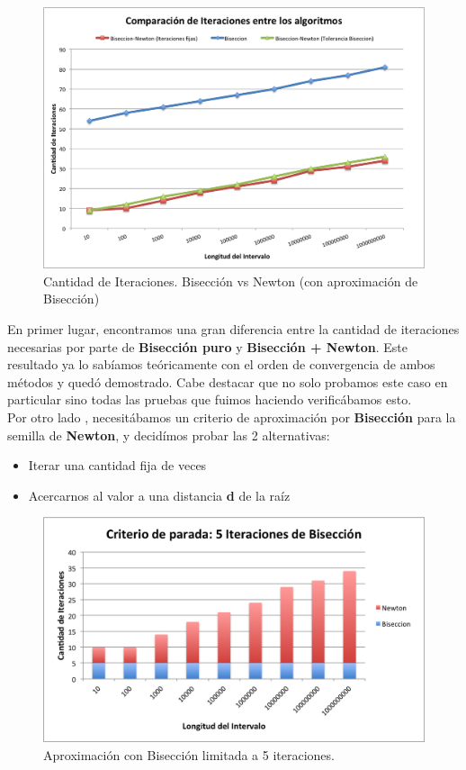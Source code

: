 \documentclass[a4paper]{article}
\begin{document}
\begin{figure}[H]
  \centering
  \includegraphics[scale=0.80]{graficos/1-Biseccion_vs_BiseccionNewton.png}
  \caption{Cantidad de Iteraciones. Bisección vs Newton (con aproximación de Bisección) }
\end{figure}

En primer lugar, encontramos una gran diferencia entre la cantidad de iteraciones necesarias por parte de \textbf{Bisección puro} y \textbf{Bisección + Newton}. Este resultado ya lo sabíamos teóricamente con el orden de convergencia de ambos métodos y quedó demostrado. Cabe destacar que no solo probamos este caso en particular sino todas las pruebas que fuimos haciendo verificábamos esto.\\[1em]
 

Por otro lado , necesitábamos un criterio de aproximación por \textbf{Bisección} para la semilla de \textbf{Newton}, y decidímos probar las 2 alternativas:
\begin{itemize}
  \item Iterar una cantidad fija de veces
  \item Acercarnos al valor a una distancia \textbf{d} de la raíz
\end{itemize}

\begin{figure}[H]
  \centering
  \includegraphics[scale=0.80]{graficos/2-BiseccionXIteraciones.png}
  \caption{Aproximación con Bisección limitada a 5 iteraciones. }
\end{figure}
 
\end{document}
